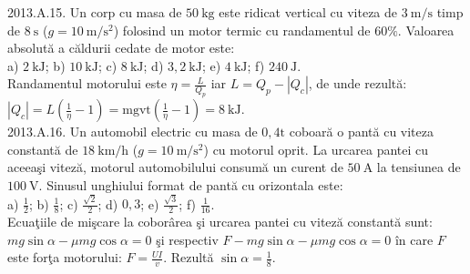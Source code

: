 2013.A.15. Un corp cu masa de $50 \mathrm{~kg}$ este ridicat vertical cu viteza de $3 \mathrm{~m} / \mathrm{s}$ timp de $8 \mathrm{~s}$ ($g=10 \mathrm{~m} / \mathrm{s}^{2}$) folosind un motor termic cu randamentul de $60 \%$. Valoarea absolută a căldurii cedate de motor este:\\ a) $2 \mathrm{~kJ}$; b) $10 \mathrm{~kJ}$; c) $8 \mathrm{~kJ}$; d) $3,2 \mathrm{~kJ}$; e) $4 \mathrm{~kJ}$; f) $240 \mathrm{~J}$.\\ Randamentul motorului este $\eta=\frac{L}{Q_{p}}$ iar $L=Q_{p}-\left|Q_{c}\right|$, de unde rezultă:\\ $\left|Q_{c}\right|=L\left(\frac{1}{\eta}-1\right)=\mathrm{m g v t}\left(\frac{1}{\eta}-1\right)=8 \mathrm{~kJ}$.\\

2013.A.16. Un automobil electric cu masa de $0,4 \mathrm{t}$ coboară o pantă cu viteza constantă de $18 \mathrm{~km} / \mathrm{h}$ ($g=10 \mathrm{~m} / \mathrm{s}^{2}$) cu motorul oprit. La urcarea pantei cu aceeaşi viteză, motorul automobilului consumă un curent de $50 \mathrm{~A}$ la tensiunea de $100 \mathrm{~V}$. Sinusul unghiului format de pantă cu orizontala este:\\ a) $\frac{1}{2}$; b) $\frac{1}{8}$; c) $\frac{\sqrt{2}}{2}$; d) $0,3$; e) $\frac{\sqrt{3}}{2}$; f) $\frac{1}{16}$.\\ Ecuaţiile de mişcare la coborârea şi urcarea pantei cu viteză constantă sunt: $m g \sin \alpha-\mu m g \cos \alpha=0$ şi respectiv $F-m g \sin \alpha-\mu m g \cos \alpha=0$ în care $F$ este forţa motorului: $F=\frac{U I}{v}$. Rezultă $\sin \alpha=\frac{1}{8}$.\\


